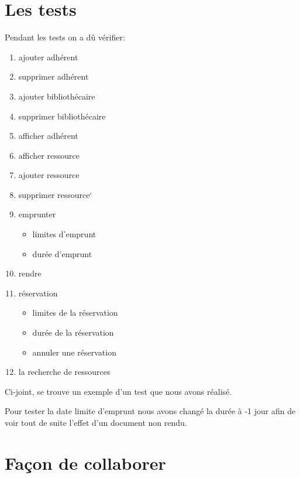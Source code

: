 \documentclass[10pt, a4paper]{article}
\begin{document}
	\section{Les tests}
	Pendant les tests on a dû vérifier:
	\begin{enumerate}
		\item ajouter adhérent
		\item supprimer adhérent
		\item ajouter bibliothécaire
		\item supprimer bibliothécaire
		\item afficher adhérent
		\item afficher ressource
		\item ajouter ressource
		\item supprimer ressource`
		\item emprunter
		\begin{itemize}
			\item limites d'emprunt
			\item durée d'emprunt
		\end{itemize}
		\item rendre
		\item réservation
		\begin{itemize}
			\item limites de la réservation
			\item durée de  la réservation
			\item annuler une réservation
		\end{itemize}
		\item la recherche de ressources 
	\end{enumerate}
	
		\bigbreak
	
	Ci-joint, se trouve un exemple d'un test que nous avons réalisé.
	
	Pour tester la date limite d'emprunt nous avons changé la durée à -1 jour afin de voir tout de suite l'effet d'un document non 
	rendu.
	
	\section{Façon de collaborer}
\end{document}
